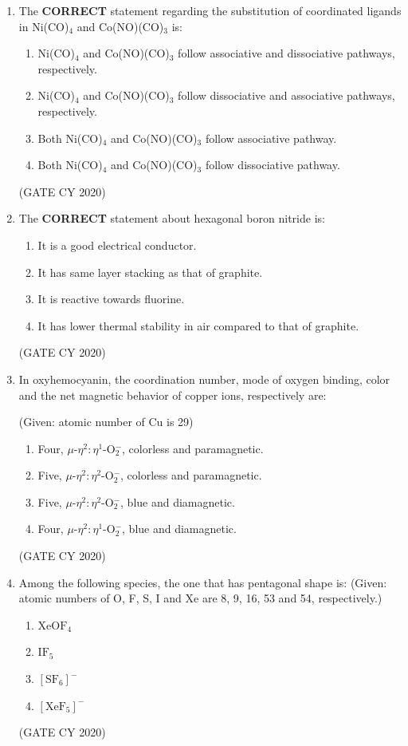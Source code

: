 \documentclass[12pt]{article}
\begin{document}
\begin{enumerate}
\item The \textbf{CORRECT} statement regarding the substitution of coordinated ligands in Ni(CO)$_4$ and Co(NO)(CO)$_3$ is:

\begin{enumerate}
    \item Ni(CO)$_4$ and Co(NO)(CO)$_3$ follow associative and dissociative pathways, respectively.
    \item Ni(CO)$_4$ and Co(NO)(CO)$_3$ follow dissociative and associative pathways, respectively.
    \item Both Ni(CO)$_4$ and Co(NO)(CO)$_3$ follow associative pathway.
    \item Both Ni(CO)$_4$ and Co(NO)(CO)$_3$ follow dissociative pathway.
\end{enumerate}
\hfill (GATE CY 2020)

\item The \textbf{CORRECT} statement about hexagonal boron nitride is:

\begin{enumerate}
    \item It is a good electrical conductor.
    \item It has same layer stacking as that of graphite.
    \item It is reactive towards fluorine.
    \item It has lower thermal stability in air compared to that of graphite.
\end{enumerate}
\hfill (GATE CY 2020)

\item In oxyhemocyanin, the coordination number, mode of oxygen binding, color and the net magnetic behavior of copper ions, respectively are:

(Given: atomic number of Cu is 29)

\begin{enumerate}
    \item Four, $\mu$-$\eta^2:\eta^1$-O$_2^-$, colorless and paramagnetic.
    \item Five, $\mu$-$\eta^2:\eta^2$-O$_2^-$, colorless and paramagnetic.
    \item Five, $\mu$-$\eta^2:\eta^2$-O$_2^-$, blue and diamagnetic.
    \item Four, $\mu$-$\eta^2:\eta^1$-O$_2^-$, blue and diamagnetic.
\end{enumerate}
\hfill (GATE CY 2020)


\item Among the following species, the one that has pentagonal shape is:
(Given: atomic numbers of O, F, S, I and Xe are 8, 9, 16, 53 and 54, respectively.)
\begin{multicols}{2}
\begin{enumerate}
    \item $\mathrm{XeOF_4}$
    \item $\mathrm{IF_5}$
    \item $[\mathrm{SF_6}]^{-}$
    \item $[\mathrm{XeF_5}]^{-}$
\end{enumerate}
\end{multicols}
\hfill (GATE CY 2020)


\end{enumerate}
\end{document}
